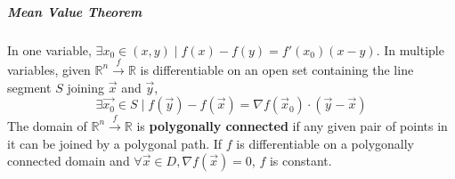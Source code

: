 \documentclass[11pt]{article}
\begin{document}
	\subparagraph{Mean Value Theorem} In one variable, $\exists x_0 \in (x, y) \mid f(x) - f(y) = f'(x_0)(x - y)$. In multiple variables, given $\mathbb{R}^n \xrightarrow{f} \mathbb{R}$ is differentiable on an open set containing the line segment $S$ joining $\vec{x}$ and $\vec{y}$,
	\begin{equation}
		\exists \vec{x_0} \in S \mid f(\vec{y}) - f(\vec{x}) = \nabla f(\vec{x}_0) \cdot (\vec{y} - \vec{x})
	\end{equation}
	The domain of $\mathbb{R}^n \xrightarrow{f} \mathbb{R}$ is \textbf{polygonally connected} if any given pair of points in it can be joined by a polygonal path. If $f$ is differentiable on a polygonally connected domain and $\forall \vec{x} \in D, \nabla f(\vec{x}) = 0$, $f$ is constant.
%		
%		


\end{document}

